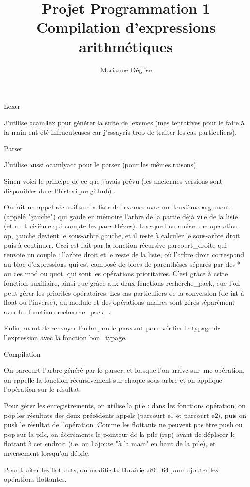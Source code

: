 \documentclass{article}
\author{Marianne Déglise}
\title{Projet Programmation 1\\
Compilation d'expressions arithmétiques}
\date{}
\theoremstyle{definition}
\begin{document}
\maketitle

\begin{section}{Lexer}

J'utilise ocamllex pour générer la suite de lexemes (mes tentatives pour le faire à la main ont été infrucuteuses car j'essayais trop de traiter les cas particuliers).

\end{section}

\begin{section}{Parser}

J'utilise aussi ocamlyacc pour le parser (pour les mêmes raisons)

\vspace{0.2 cm}

Sinon voici le principe de ce que j'avais prévu (les anciennes versions sont disponibles dans l'historique github) : 

On fait un appel récursif sur la liste de lexemes avec un deuxième argument (appelé "gauche") qui garde en mémoire l'arbre de la partie déjà vue de la liste (et un troisième qui compte les parenthèses). 
Lorsque l'on croise une opération op, gauche devient le sous-arbre gauche, et il reste à calculer le sous-arbre droit puis à continuer. 
Ceci est fait par la fonction récursive parcourt\_droite qui renvoie un couple : 
l'arbre droit et le reste de la liste, où l'arbre droit correspond au bloc d'expressions qui est composé de blocs de parenthèses séparés par des * ou des mod ou quot, 
qui sont les opérations prioritaires. 
C'est grâce à cette fonction auxiliaire, ainsi que grâce aux deux fonctions recherche\_pack, que l'on peut gérer les priorités opératoires. 
Les cas particuliers de la conversion (de int à float ou l'inverse), 
du modulo et des opérations unaires sont gérés séparément avec les fonctions recherche\_pack\_.

Enfin, avant de renvoyer l'arbre, on le parcourt pour vérifier le typage de l'expression avec la fonction bon\_typage.

\end{section}

\begin{section}{Compilation}

On parcourt l'arbre généré par le parser, et lorsque l'on arrive sur une opération, on appelle la fonction récursivement sur chaque sous-arbre et on applique l'opération sur le résultat.

Pour gérer les enregistrements, on utilise la pile : dans les fonctions opération, on pop les résultats des deux précédents appels (parcourt e1 et parcourt e2), puis on push le résultat de l'opération. 
Comme les flottants ne peuvent pas être push ou pop sur la pile, on décrémente le pointeur de la pile (rsp) avant de déplacer le flottant à cet endroit (i.e. on l'ajoute "à la main" en haut de la pile), et inversement lorsqu'on dépile.

Pour traiter les flottants, on modifie la librairie x86\_64 pour ajouter les opérations flottantes.

\end{section}
\end{document}
